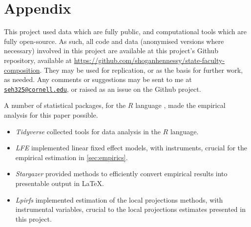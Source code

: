 \newpage
\appendix
\setcounter{table}{0}
\renewcommand{\thetable}{A\arabic{table}}
\setcounter{figure}{0}
\renewcommand{\thefigure}{A\arabic{figure}}

\section{Appendix}
\label{appendix}
This project used data which are fully public, and computational tools which are fully open-source.
As such, all code and data (anonymised versions where necessary) involved in this project are available at this project's Github repository, available at \url{https://github.com/shoganhennessy/state-faculty-composition}.
They may be used for replication, or as the basis for further work, as needed.
Any comments or suggestions may be sent to me at \href{mailto:seh325@cornell.edu}{\nolinkurl{seh325@cornell.edu}}, or raised as an issue on the Github project.

A number of statistical packages, for the $R$ language \citep{R2022}, made the empirical analysis for this paper possible.
\begin{itemize}
    \item \textit{Tidyverse} \citep{tidyverse} collected tools for data analysis in the $R$ language.
    \item \textit{LFE} \citep{lfe} implemented linear fixed effect models, with instruments, crucial for the empirical estimation in \autoref{sec:empirics}.
    \item \textit{Stargazer} \citep{stargazer} provided methods to efficiently convert empirical results into presentable output in \LaTeX.
    \item \textit{Lpirfs} \citep{lpirfs2019} implemented estimation of the \cite{jorda2005} local projections methods, with instrumental variables, crucial to the local projections estimates presented in this project.
\end{itemize}

